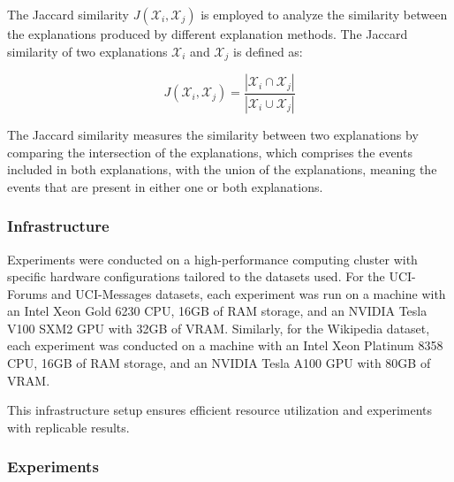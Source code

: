 The Jaccard similarity \cite{jaccard_distribution_1912} $J(\mathcal{X}_i, \mathcal{X}_j)$ is employed to analyze the similarity between the explanations produced by different explanation methods. The Jaccard similarity of two explanations $\mathcal{X}_i$ and $\mathcal{X}_j$ is defined as:

\begin{equation}
    J(\mathcal{X}_i, \mathcal{X}_j) = \frac{|\mathcal{X}_i \cap \mathcal{X}_j|}{|\mathcal{X}_i \cup \mathcal{X}_j|}
\end{equation}

The Jaccard similarity measures the similarity between two explanations by comparing the intersection of the explanations, which comprises the events included in both explanations, with the union of the explanations, meaning the events that are present in either one or both explanations.




% 

\subsubsection{Infrastructure}
\label{s_Evaluation_Setup_Infrastructure}
Experiments were conducted on a high-performance computing cluster with specific hardware configurations tailored to the datasets used. For the UCI-Forums and UCI-Messages datasets, each experiment was run on a machine with an Intel Xeon Gold 6230 CPU, 16GB of RAM storage, and an NVIDIA Tesla V100 SXM2 GPU with 32GB of VRAM. Similarly, for the Wikipedia dataset, each experiment was conducted on a machine with an Intel Xeon Platinum 8358 CPU, 16GB of RAM storage, and an NVIDIA Tesla A100 GPU with 80GB of VRAM.

This infrastructure setup ensures efficient resource utilization and experiments with replicable results.

\subsubsection{Experiments}
\label{s_Evaluation_Setup_Experiments}

